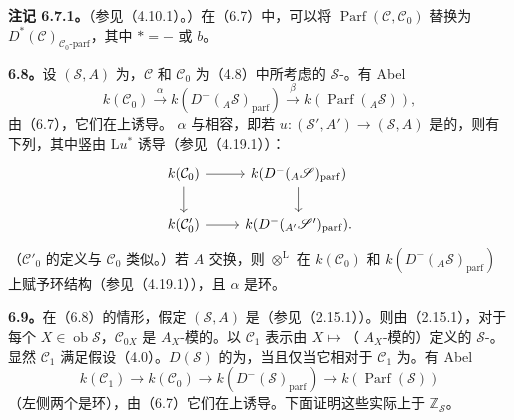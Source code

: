\textbf{注记 6.7.1。}（参见（4.10.1）。）在（6.7）中，可以将 $\operatorname{Parf}(\mathcal C,\mathcal C_0)$ 替换为 $D^*(\mathcal C)_{\mathcal C_0\text{-}\mathrm{parf}}$，其中 $*= -$ 或 $b$。

\textbf{6.8。}设 $(\mathscr S,A)$ 为，$\mathcal C$ 和 $\mathcal C_0$ 为（4.8）中所考虑的 $\mathscr S$-。有 Abel 
\[k(\mathcal C_0)\xrightarrow{\alpha}k(D^-({}_A\mathscr S)_{\mathrm{parf}})\xrightarrow{\beta}k(\operatorname{Parf}({}_A\mathscr S)),\]
由（6.7），它们在上诱导。 $\alpha$ 与相容，即若
$u:(\mathscr S',A')\to(\mathscr S,A)$ 是的，则有下列，其中竖由 $\mathrm Lu^*$ 诱导（参见（4.19.1））：
\[\begin{tikzcd}
k(\mathcal C_0)\arrow[r]\arrow[d]&k(D^-({}_A\mathscr S)_{\mathrm{parf}})\arrow[d]\\
k(\mathcal C'_0)\arrow[r]&k(D^-({}_{A'}\mathscr S')_{\mathrm{parf}}).
\end{tikzcd}\]
（$\mathcal C'_0$ 的定义与 $\mathcal C_0$ 类似。）若 $A$ 交换，则 $\mathbin{\otimes^{\mathrm L}}$ 在 $k(\mathcal C_0)$ 和 $k(D^-({}_A\mathscr S)_{\mathrm{parf}})$ 上赋予环结构（参见（4.19.1）），且 $\alpha$ 是环。

\textbf{6.9。}在（6.8）的情形，假定 $(\mathscr S,A)$ 是（参见（2.15.1））。则由（2.15.1），对于每个 $X\in\operatorname{ob}\mathscr S$，$\mathcal C_{0X}$ 是 $A_X$-模的。以 $\mathcal C_1$ 表示由 $X\mapsto$（ $A_X$-模的）定义的 $\mathscr S$-。显然 $\mathcal C_1$ 满足假设（4.0）。$D(\mathscr S)$ 的为，当且仅当它相对于 $\mathcal C_1$ 为。有 Abel 
\[k(\mathcal C_1)\longrightarrow k(\mathcal C_0)\longrightarrow k(D^-(\mathscr S)_{\mathrm{parf}})\longrightarrow k(\operatorname{Parf}(\mathscr S))\]
（左侧两个是环），由（6.7）它们在上诱导。下面证明这些实际上于 $\mathbb Z_{\mathscr S}$。

